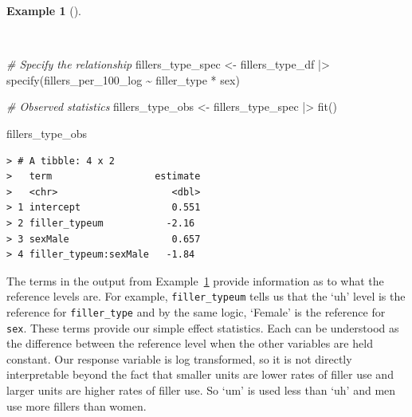 \documentclass[
  letterpaper,
  DIV=11,
  numbers=noendperiod]{scrreprt}
\newenvironment{Shaded}{\begin{snugshade}}{\end{snugshade}}
\newcommand{\CommentTok}[1]{\textcolor[rgb]{0.00,0.00,0.00}{\textit{#1}}}
\newcommand{\FunctionTok}[1]{\textcolor[rgb]{0.00,0.00,0.00}{#1}}
\newcommand{\NormalTok}[1]{\textcolor[rgb]{0.00,0.00,0.00}{#1}}
\newcommand{\OtherTok}[1]{\textcolor[rgb]{0.00,0.00,0.00}{#1}}
\newcommand{\SpecialCharTok}[1]{\textcolor[rgb]{0.00,0.00,0.00}{#1}}
\theoremstyle{definition}
\newtheorem{example}{Example}[chapter]
\theoremstyle{remark}
\begin{document}
\begin{example}[]\protect\hypertarget{exm-ida-num-multi-spec}{}\label{exm-ida-num-multi-spec}

~

\begin{Shaded}
\begin{Highlighting}[]
\CommentTok{\# Specify the relationship}
\NormalTok{fillers\_type\_spec }\OtherTok{\textless{}{-}}
\NormalTok{  fillers\_type\_df }\SpecialCharTok{|\textgreater{}}
  \FunctionTok{specify}\NormalTok{(fillers\_per\_100\_log }\SpecialCharTok{\textasciitilde{}}\NormalTok{ filler\_type }\SpecialCharTok{*}\NormalTok{ sex)}

\CommentTok{\# Observed statistics}
\NormalTok{fillers\_type\_obs }\OtherTok{\textless{}{-}}
\NormalTok{  fillers\_type\_spec }\SpecialCharTok{|\textgreater{}}
  \FunctionTok{fit}\NormalTok{()}

\NormalTok{fillers\_type\_obs}
\end{Highlighting}
\end{Shaded}

\begin{verbatim}
> # A tibble: 4 x 2
>   term                  estimate
>   <chr>                    <dbl>
> 1 intercept                0.551
> 2 filler_typeum           -2.16 
> 3 sexMale                  0.657
> 4 filler_typeum:sexMale   -1.84
\end{verbatim}

\end{example}

The terms in the output from Example~\ref{exm-ida-num-multi-spec}
provide information as to what the reference levels are. For example,
\texttt{filler\_typeum} tells us that the `uh' level is the reference
for \texttt{filler\_type} and by the same logic, `Female' is the
reference for \texttt{sex}. These terms provide our simple effect
statistics. Each can be understood as the difference between the
reference level when the other variables are held constant. Our response
variable is log transformed, so it is not directly interpretable beyond
the fact that smaller units are lower rates of filler use and larger
units are higher rates of filler use. So `um' is used less than `uh' and
men use more fillers than women.
\end{document}
